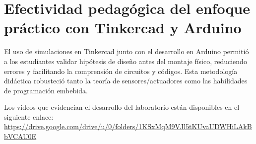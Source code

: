 \section*{Efectividad pedagógica del enfoque práctico con Tinkercad y Arduino}

El uso de simulaciones en Tinkercad junto con el desarrollo en Arduino permitió a los estudiantes validar hipótesis de diseño antes del montaje físico, reduciendo errores y facilitando la comprensión de circuitos y códigos. Esta metodología didáctica robusteció tanto la teoría de sensores/actuadores como las habilidades de programación embebida.

Los videos que evidencian el desarrollo del laboratorio están disponibles en el siguiente enlace: \url{https://drive.google.com/drive/u/0/folders/1KSxMqM9VJl5tKUvaUDWHiLAkBbVCAU0E}